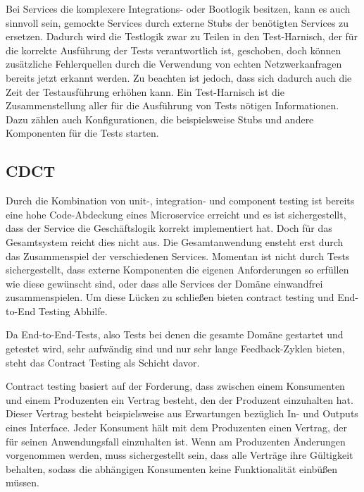 \documentclass[12pt,a4paper,bibliography=totocnumbered,listof=totocnumbered]{scrartcl}
\begin{document}

Bei Services die komplexere Integrations- oder Bootlogik besitzen, kann es auch sinnvoll sein, gemockte Services durch externe Stubs der benötigten Services zu ersetzen. Dadurch wird die Testlogik zwar zu Teilen in den Test-Harnisch, der für die korrekte Ausführung der Tests verantwortlich ist, geschoben, doch können zusätzliche Fehlerquellen durch die Verwendung von echten Netzwerkanfragen bereits jetzt erkannt werden. Zu beachten ist jedoch, dass sich dadurch auch die Zeit der Testausführung erhöhen kann.\cite{clemson} Ein Test-Harnisch ist die Zusammenstellung aller für die Ausführung von Tests nötigen Informationen. Dazu zählen auch Konfigurationen, die beispielsweise Stubs und andere Komponenten für die Tests starten.

\subsection{\acf{CDCT}}

Durch die Kombination von unit-, integration- und component testing ist bereits eine hohe Code-Abdeckung eines Microservice erreicht und es ist sichergestellt, dass der Service die Geschäftslogik korrekt implementiert hat. Doch für das Gesamtsystem reicht dies nicht aus. Die Gesamtanwendung ensteht erst durch das Zusammenspiel der verschiedenen Services. Momentan ist nicht durch Tests sichergestellt, dass externe Komponenten die eigenen Anforderungen so erfüllen wie diese gewünscht sind, oder dass alle Services der Domäne einwandfrei zusammenspielen.\cite{clemson} Um diese Lücken zu schließen bieten contract testing und End-to-End Testing Abhilfe.

Da End-to-End-Tests, also Tests bei denen die gesamte Domäne gestartet und getestet wird, sehr aufwändig sind und nur sehr lange Feedback-Zyklen bieten, steht das Contract Testing als Schicht davor.\cite{clemson}

Contract testing basiert auf der Forderung, dass zwischen einem Konsumenten und einem Produzenten ein Vertrag besteht, den der Produzent einzuhalten hat. Dieser Vertrag besteht beispielsweise aus Erwartungen bezüglich In- und Outputs eines Interface. Jeder Konsument hält mit dem Produzenten einen Vertrag, der für seinen Anwendungsfall einzuhalten ist. Wenn am Produzenten Änderungen vorgenommen werden, muss sichergestellt sein, dass alle Verträge ihre Gültigkeit behalten, sodass die abhängigen Konsumenten keine Funktionalität einbüßen müssen.\cite{clemson}
\end{document}
